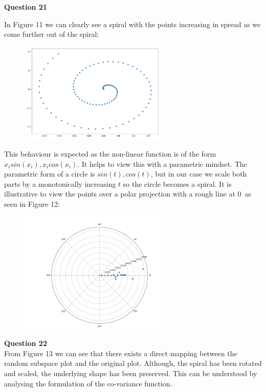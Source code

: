 \documentclass[10pt, a4paper, twocolumn]{article} %
\begin{document}
\begin{enumerate}
  \textbf{Question 21}
  
  In Figure 11 we can clearly see a spiral with the points increasing in spread as we come further out of the spiral:
  
  \begin{figure}[H]
      \centering
      \includegraphics[width=70mm,scale=0.5]{images/q21.png}
      \label{fig:Q20_graph_1}
      \caption{}
  \end{figure}

  This behaviour is expected as the non-linear function is of the form $x_{i}sin(x_{i}), x_{i}cos(x_{i})$. It helps to view this with a parametric mindset. The parametric form of a circle is $sin(t),cos(t)$, but in our case we scale both parts by a monotonically increasing $t$ so the circle becomes a spiral. It is illustrative to view the points over a polar projection with a rough line at 0\textdegree \ as seen in Figure 12:
  
  \begin{figure}[H]
      \centering
      \includegraphics[width=70mm,scale=0.5]{images/q22polar.png}
      \label{fig:Q20_graph_1}
      \caption{}
  \end{figure}
  
  \textbf{Question 22}\\
  From Figure 13 we can see that there exists a direct mapping between the random subspace plot and the original plot. Although, the spiral has been rotated and scaled, the underlying shape has been preserved. This can be understood by analysing the formulation of the co-variance function.\\
  

\end{enumerate}
\end{document}
